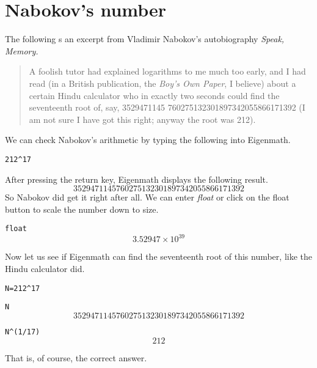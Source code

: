 \section{Nabokov's number}

\noindent
The following s an excerpt from Vladimir Nabokov's
autobiography {\it Speak, Memory.}
\begin{quote}
A foolish tutor had explained logarithms to me much too early, and I had
read (in a British publication, the {\it Boy's Own Paper}, I believe)
about a certain Hindu calculator who in exactly two seconds could find the
seventeenth root of, say,
3529471145 760275132301897342055866171392
(I am not sure I have got this right; anyway the root was 212).
\end{quote}
We can check Nabokov's arithmetic by typing the following into Eigenmath.

\medskip
\verb$212^17$

\medskip
\noindent
After pressing the return key, Eigenmath displays the following result.
$$3529471145760275132301897342055866171392$$
So Nabokov did get it right after all.
We can enter {\it float} or click on the float button to scale the number
down to size.

\medskip
\verb$float$
$$3.52947\times10^{39}$$

\medskip
\noindent
Now let us see if Eigenmath can find the
seventeenth root of this number, like the Hindu calculator did.

\medskip
\verb$N=212^17$

\verb$N$
$$3529471145760275132301897342055866171392$$

\verb$N^(1/17)$
$$212$$

\medskip
\noindent
That is, of course, the correct answer.

